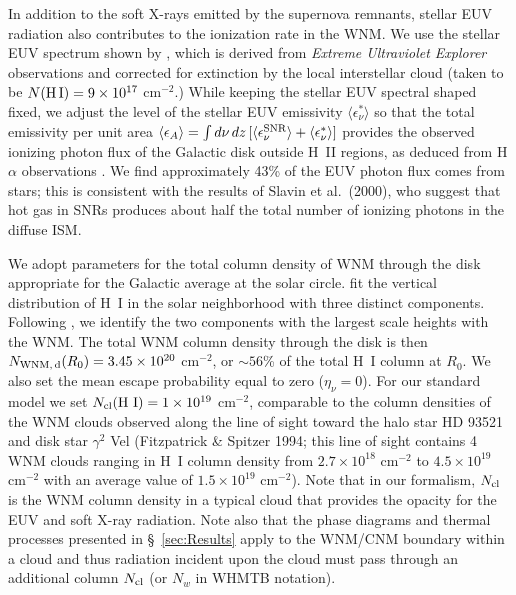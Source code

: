 \documentclass[12pt,preprint,flushrt]{aastex}
\begin{document}
In addition to the soft X-rays emitted by the supernova remnants,
stellar EUV radiation also contributes to the ionization rate in the
WNM. We use the stellar EUV spectrum shown by \cite{slav98}, which is
derived from {\em Extreme Ultraviolet Explorer} observations \citep{vall96}
and corrected for extinction by the
local interstellar cloud (taken to be
$N({\rm H\,I}) = 9\times 10^{17}$ cm$^{-2}$.)
While keeping the stellar EUV spectral shaped fixed, we adjust the
level of the stellar EUV emissivity $\langle \epsilon_{\nu}^{ *} \rangle$
so that the total emissivity per unit area
$\langle \epsilon_{A}\rangle = \int d\nu \,dz\,
[\langle \epsilon_{\nu}^{\rm SNR}\rangle + \langle \epsilon_{\nu}^* \rangle ]$
provides the observed ionizing photon flux of the Galactic disk
outside H~II regions, as
deduced from H$\alpha$ observations
\cite[$\langle \epsilon_A \rangle
\approx 4\times 10^{6}$ ${\rm ph\, cm^{-2}\, s^{-1}}$;][]{rey84,rey95}.
We find approximately 43\% of the EUV photon flux comes from
stars;
this is consistent with the results of Slavin et al.\ (2000), who
suggest that hot gas in SNRs produces about half the total number
of ionizing photons in the diffuse ISM.

We adopt parameters for the total column density of WNM
through the disk
appropriate for the Galactic average at the
solar circle.
\cite{dic90} fit the vertical distribution of H~I in the solar
neighborhood with three distinct components.
Following \cite{kul87}, we identify the two components with
the largest scale heights with the WNM.
The total WNM column density through
the disk is then
$N_{\rm WNM,\, d}(R_0) = 3.45\times 10^{20}$ cm$^{-2}$, or
$\sim 56$\% of the total H~I column at $R_0$. We also set the
mean escape probability equal to zero ($\eta_{\nu} = 0$). For our
standard model we set
$N_{\rm cl}({\rm H~I}) = 1\times 10^{19}$ cm$^{-2}$,
comparable to the column densities of the WNM clouds observed
along the line of sight toward the halo star HD 93521 \citep{spi93}
and disk star $\gamma^2$ Vel (Fitzpatrick \& Spitzer 1994; this line
of sight contains 4 WNM clouds ranging in H~I column density from 
$2.7\times 10^{18}$ cm$^{-2}$ to $4.5\times 10^{19}$ cm$^{-2}$ with
an average value of $1.5\times 10^{19}$ cm$^{-2}$). 
Note that in our formalism, $N_{\rm cl}$ is the WNM column density
in a typical cloud that provides the opacity
for the EUV and soft X-ray radiation. Note also that the phase diagrams
and thermal processes presented in \S~\ref{sec:Results} apply to the WNM/CNM
boundary within a cloud and thus radiation incident upon the cloud
must pass through an additional column
$N_{\rm cl}$ (or $N_w$ in WHMTB notation).  
\end{document}
